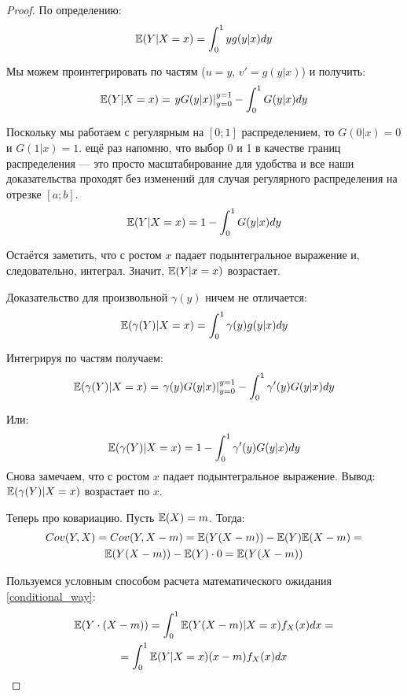 \begin{proof}
По определению:
\begin{equation}
\mathbb{E}(Y|X=x)=\int_{0}^{1}yg(y|x)dy
\end{equation}

Мы можем проинтегрировать по частям ($ u=y $, $ v'=g(y|x) $) и получить:
\begin{equation}
\mathbb{E}(Y|X=x)=\left.yG(y|x)\right|_{y=0}^{y=1} - \int_{0}^{1}G(y|x)dy
\end{equation}

Поскольку мы работаем с регулярным на $ [0;1] $ распределением, то $ G(0|x)=0 $ и $ G(1|x)=1 $. ещё раз напомню, что выбор 0 и 1 в качестве границ распределения — это просто масштабирование для удобства и все наши доказательства проходят без изменений для случая регулярного распределения на отрезке $ [a;b] $.
\begin{equation}
\mathbb{E}(Y|X=x)=1 - \int_{0}^{1}G(y|x)dy
\end{equation}

Остаётся заметить, что с ростом $ x $ падает подынтегральное выражение и, следовательно, интеграл. Значит, $ \mathbb{E}(Y|x=x) $ возрастает.

Доказательство для произвольной $ \gamma(y) $ ничем не отличается:
\begin{equation}
\mathbb{E}(\gamma(Y)|X=x)=\int_{0}^{1}\gamma(y)g(y|x)dy
\end{equation}

Интегрируя по частям получаем:
\begin{equation}
\mathbb{E}(\gamma(Y)|X=x)=\left.\gamma(y)G(y|x)\right|_{y=0}^{y=1} - \int_{0}^{1}\gamma'(y)G(y|x)dy
\end{equation}

Или:
\begin{equation}
\mathbb{E}(\gamma(Y)|X=x)=1 - \int_{0}^{1}\gamma'(y)G(y|x)dy
\end{equation}
Снова замечаем, что с ростом $ x $ падает подынтегральное выражение. Вывод: $ \mathbb{E}(\gamma(Y)|X=x) $ возрастает по $x$.


Теперь про ковариацию. Пусть $ \mathbb{E}(X)=m $. Тогда:
\begin{multline}
Cov(Y,X)=Cov(Y,X-m)=\mathbb{E}(Y(X-m))-\mathbb{E}(Y)\mathbb{E}(X-m)=\\
\mathbb{E}(Y(X-m))-\mathbb{E}(Y)\cdot 0=\mathbb{E}(Y(X-m))
\end{multline}

Пользуемся условным способом расчета математического ожидания \ref{conditional_way}:
\begin{multline}
\mathbb{E}(Y\cdot (X-m))=\int_{0}^{1} \mathbb{E}(Y(X-m)|X=x)f_{X}(x)dx=\\
=\int_{0}^{1}\mathbb{E}(Y|X=x)(x-m)f_{X}(x)dx
\end{multline}


\end{proof}
